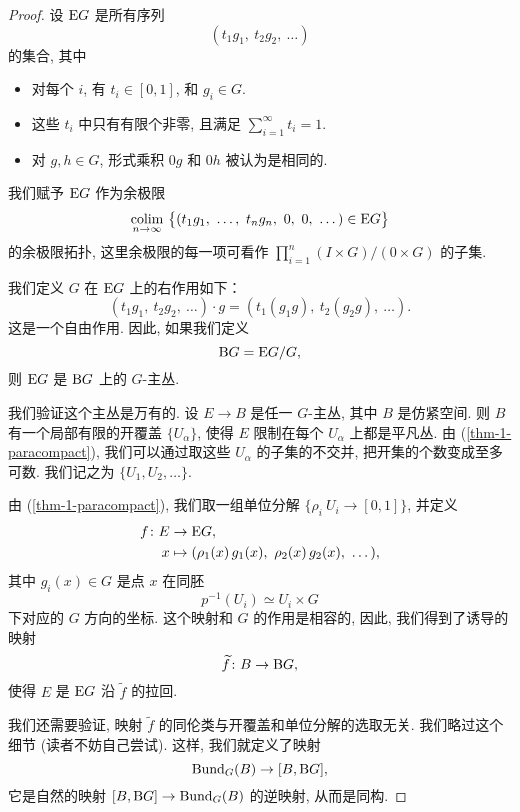 \begin{proof}
    设 $\mathrm{E} G$ 是所有序列
    \[ ( t_1 g_1,\ t_2 g_2,\ \dotsc ) \]
    的集合, 其中
    \begin{itemize}
        \item
            对每个 $i$, 有 $t_i \in [0, 1]$, 和 $g_i \in G$. 
        \item
            这些 $t_i$ 中只有有限个非零, 
            且满足 $\sum_{i = 1}^{\infty} t_i = 1$. 
        \item
            对 $g, h \in G$, 
            形式乘积 $0g$ 和 $0h$ 被认为是相同的. 
    \end{itemize}
    我们赋予 $\mathrm{E} G$ 作为余极限
    \[ \colim _{n \to \infty} \ \bigl\{
        ( t_1 g_1, \ \dotsc, \ t_n g_n, \ 0, \ 0, \ \dotsc ) \in \upE G
    \bigr\} \]
    的余极限拓扑, 这里余极限的每一项可看作
    $\prod _{i=1} ^{n} (I \times G) / (0 \times G)$ 的子集.

    我们定义 $G$ 在 $\mathrm{E} G$ 上的右作用如下：
    \[
        ( t_1 g_1,\ t_2 g_2,\ \dotsc ) \cdot g
        = ( t_1 (g_1 g),\ t_2 (g_2 g),\ \dotsc ).
    \]
    这是一个自由作用. 因此, 如果我们定义
    \[ \mathrm{B} G = \mathrm{E} G / G, \]
    则 $\mathrm{E} G$ 是 $\mathrm{B} G$ 上的 $G$-主丛. 

    我们验证这个主丛是万有的.
    设 $E \to B$ 是任一 $G$-主丛, 其中 $B$ 是仿紧空间. 
    则 $B$ 有一个局部有限的开覆盖 $\{ U_\alpha \}$, 
    使得 $E$ 限制在每个 ${U_\alpha}$ 上都是平凡丛. 
    由 (\ref{thm-1-paracompact}), 
    我们可以通过取这些 $U_\alpha$ 的子集的不交并,
    把开集的个数变成至多可数. 
    我们记之为 $\{ U_1, U_2, \dotsc \}$.

    由 (\ref{thm-1-paracompact}), 
    我们取一组单位分解 $\{ \rho_i \: U_i \to [0, 1] \}$,
    并定义
    \[ \begin{aligned}
        f \: E & \to \upE G, \\
        x & \mapsto ( \rho_1(x) \, g_1(x),\ \rho_2(x) \, g_2(x),\ \dotsc ),
    \end{aligned} \]
    其中 $g_i(x) \in G$ 是点 $x$ 在同胚
    \[ p^{-1}(U_i) \simeq U_i \times G \]
    下对应的 $G$ 方向的坐标.
    这个映射和 $G$ 的作用是相容的, 因此, 我们得到了诱导的映射
    \[ \widetilde{f} \colon B \to \mathrm{B} G, \]
    使得 $E$ 是 $\mathrm{E} G$ 沿 $\widetilde{f}$ 的拉回.

    我们还需要验证, 映射 $\widetilde{f}$ 的同伦类与开覆盖和单位分解的选取无关.
    我们略过这个细节 (读者不妨自己尝试). 这样, 我们就定义了映射
    \[ \operatorname{Bund}_G (B) \to [B, \mathrm{B} G], \]
    它是自然的映射 $[B, \mathrm{B} G] \to \operatorname{Bund}_G (B)$
    的逆映射, 从而是同构.
\end{proof}

